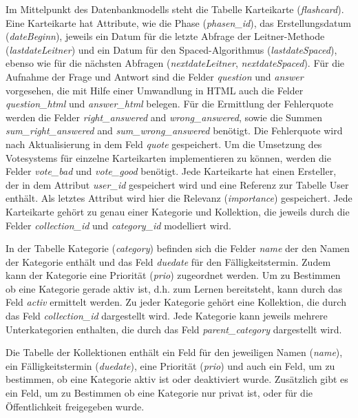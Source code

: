 
Im Mittelpunkt des Datenbankmodells steht die Tabelle Karteikarte (\emph{flashcard}). Eine Karteikarte hat Attribute, wie die Phase (\emph{phasen{\_}id}), das Erstellungsdatum (\emph{dateBeginn}), jeweils ein Datum für die letzte Abfrage der Leitner-Methode (\emph{lastdateLeitner}) und ein Datum für den Spaced-Algorithmus (\emph{lastdateSpaced}), ebenso wie für die nächsten Abfragen (\emph{nextdateLeitner}, \emph{nextdateSpaced}). Für die Aufnahme der Frage und Antwort sind die Felder \emph{question} und \emph{answer} vorgesehen, die mit Hilfe einer Umwandlung in HTML auch die Felder \emph{question{\_}html} und \emph{answer{\_}html} belegen. Für die Ermittlung der Fehlerquote werden die Felder \emph{right{\_}answered} and \emph{wrong{\_}answered}, sowie die Summen \emph{sum{\_}right{\_}answered} and \emph{sum{\_}wrong{\_}answered} benötigt. Die Fehlerquote wird nach Aktualisierung in dem Feld \emph{quote} gespeichert. Um die Umsetzung des Votesystems für einzelne Karteikarten implementieren zu können, werden die Felder \emph{vote{\_}bad} und \emph{vote{\_}good} benötigt. Jede Karteikarte hat einen Ersteller, der in dem Attribut \emph{user{\_}id} gespeichert wird und eine Referenz zur Tabelle User enthält. Als letztes Attribut wird hier die Relevanz (\emph{importance}) gespeichert. Jede Karteikarte gehört zu genau einer Kategorie und Kollektion, die jeweils durch die Felder \emph{collection{\_}id} und \emph{category{\_}id} modelliert wird.

In der Tabelle Kategorie (\emph{category}) befinden sich die Felder \emph{name} der den Namen der Kategorie enthält und das Feld \emph{duedate} für den Fälligkeitstermin. Zudem kann der Kategorie eine Priorität (\emph{prio}) zugeordnet werden. Um zu Bestimmen ob eine Kategorie gerade aktiv ist, d.h. zum Lernen bereitsteht, kann durch das Feld \emph{activ} ermittelt werden. Zu jeder Kategorie gehört eine Kollektion, die durch das Feld \emph{collection{\_}id} dargestellt wird. Jede Kategorie kann jeweils mehrere Unterkategorien enthalten, die durch das Feld \emph{parent{\_}category} dargestellt wird.

Die Tabelle der Kollektionen enthält ein Feld für den jeweiligen Namen (\emph{name}), ein Fälligkeitstermin (\emph{duedate}), eine Priorität (\emph{prio}) und auch ein Feld, um zu bestimmen, ob eine Kategorie aktiv ist oder deaktiviert wurde. Zusätzlich gibt es ein Feld, um zu Bestimmen ob eine Kategorie nur privat ist, oder für die Öffentlichkeit freigegeben wurde. 

